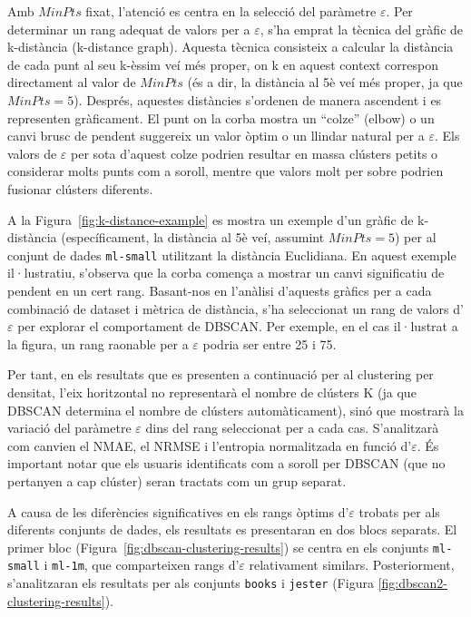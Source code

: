 \documentclass[a4paper,12pt]{report}
\begin{document}
Amb \(\mathit{MinPts}\) fixat, l'atenció es centra en la selecció del paràmetre \(\varepsilon\). Per determinar un rang adequat de valors per a \(\varepsilon\), s'ha emprat la tècnica del gràfic de k-distància (k-distance graph). Aquesta tècnica consisteix a calcular la distància de cada punt al seu k-èssim veí més proper, on k en aquest context correspon directament al valor de \(\mathit{MinPts}\) (és a dir, la distància al 5è veí més proper, ja que \(\mathit{MinPts}=5\)). Després, aquestes distàncies s'ordenen de manera ascendent i es representen gràficament. El punt on la corba mostra un ``colze'' (elbow) o un canvi brusc de pendent suggereix un valor òptim o un llindar natural per a \(\varepsilon\). Els valors de \(\varepsilon\) per sota d'aquest colze podrien resultar en massa clústers petits o considerar molts punts com a soroll, mentre que valors molt per sobre podrien fusionar clústers diferents.

A la Figura~\ref{fig:k-distance-example} es mostra un exemple d'un gràfic de k-distància (específicament, la distància al 5è veí, assumint \(\mathit{MinPts}=5\)) per al conjunt de dades \texttt{ml-small} utilitzant la distància Euclidiana. En aquest exemple il·lustratiu, s'observa que la corba comença a mostrar un canvi significatiu de pendent en un cert rang. Basant-nos en l'anàlisi d'aquests gràfics per a cada combinació de dataset i mètrica de distància, s'ha seleccionat un rang de valors d'\(\varepsilon\) per explorar el comportament de DBSCAN. Per exemple, en el cas il·lustrat a la figura, un rang raonable per a \(\varepsilon\) podria ser entre 25 i 75.

Per tant, en els resultats que es presenten a continuació per al clustering per densitat, l'eix horitzontal no representarà el nombre de clústers K (ja que DBSCAN determina el nombre de clústers automàticament), sinó que mostrarà la variació del paràmetre \(\varepsilon\) dins del rang seleccionat per a cada cas. S'analitzarà com canvien el NMAE, el NRMSE i l'entropia normalitzada en funció d'\(\varepsilon\). És important notar que els usuaris identificats com a soroll per DBSCAN (que no pertanyen a cap clúster) seran tractats com un grup separat.

A causa de les diferències significatives en els rangs òptims d'\(\varepsilon\) trobats per als diferents conjunts de dades, els resultats es presentaran en dos blocs separats. El primer bloc (Figura~\ref{fig:dbscan-clustering-results}) se centra en els conjunts \texttt{ml-small} i \texttt{ml-1m}, que comparteixen rangs d'\(\varepsilon\) relativament similars. Posteriorment, s'analitzaran els resultats per als conjunts \texttt{books} i \texttt{jester} (Figura \ref{fig:dbscan2-clustering-results}).
\end{document}
